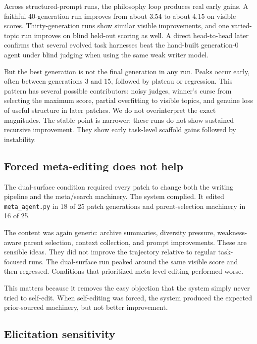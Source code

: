 \documentclass[11pt]{article}
\begin{document}
Across structured-prompt runs, the philosophy loop produces real early gains. A faithful 40-generation run improves from about 3.54 to about 4.15 on visible scores. Thirty-generation runs show similar visible improvements, and one varied-topic run improves on blind held-out scoring as well. A direct head-to-head later confirms that several evolved task harnesses beat the hand-built generation-0 agent under blind judging when using the same weak writer model.

But the best generation is not the final generation in any run. Peaks occur early, often between generations 3 and 15, followed by plateau or regression. This pattern has several possible contributors: noisy judges, winner's curse from selecting the maximum score, partial overfitting to visible topics, and genuine loss of useful structure in later patches. We do not overinterpret the exact magnitudes. The stable point is narrower: these runs do not show sustained recursive improvement. They show early task-level scaffold gains followed by instability.

\subsection{Forced meta-editing does not help}\label{forced-meta-editing-does-not-help}

The dual-surface condition required every patch to change both the writing pipeline and the meta/search machinery. The system complied. It edited \texttt{meta\_agent.py} in 18 of 25 patch generations and parent-selection machinery in 16 of 25.

The content was again generic: archive summaries, diversity pressure, weakness-aware parent selection, context collection, and prompt improvements. These are sensible ideas. They did not improve the trajectory relative to regular task-focused runs. The dual-surface run peaked around the same visible score and then regressed. Conditions that prioritized meta-level editing performed worse.

This matters because it removes the easy objection that the system simply never tried to self-edit. When self-editing was forced, the system produced the expected prior-sourced machinery, but not better improvement.

\subsection{Elicitation sensitivity}\label{elicitation-sensitivity}
\end{document}
